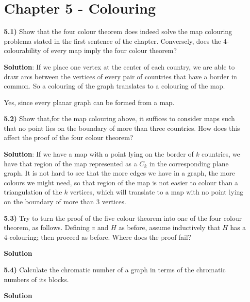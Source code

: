 \documentclass[11pt]{article}
\theoremstyle{plain}
\begin{document}
\section{Chapter 5 - Colouring}

\textbf{5.1)} Show that the four colour theorem does indeed solve the map colouring problema stated in the first sentence of the chapter. Conversely, does the 4-colourability of every map imply the four colour theorem?

\vspace{.4cm}
\noindent \textbf{Solution}: If we place one vertex at the center of each country, we are able to draw arcs between the vertices of every pair of countries that have a border in common. So a colouring of the graph translates to a colouring of the map.

Yes, since every planar graph can be formed from a map.

\vspace{.4cm}
\textbf{5.2)} Show that,for the map colouring above, it suffices to consider maps such that no point lies on the boundary of more than three countries. How does this affect the proof of the four colour theorem?

\vspace{.4cm}
\noindent \textbf{Solution}: If we have a map with a point lying on the border of $k$ countries, we have that region of the map represented as a $C_k$ in the corresponding plane graph. It is not hard to see that the more edges we have in a graph, the more colours we might need, so that region of the map is not easier to colour than a triangulation of the $k$ vertices, which will translate to a map with no point lying on the boundary of more than 3 vertices.

\vspace{.4cm}
\textbf{5.3)} Try to turn the proof of the five colour theorem into one of the four colour theorem, as follows. Defining $v$ and $H$ as before, assume inductively that $H$ has a 4-colouring; then proceed as before. Where does the proof fail?

\vspace{.4cm}
\noindent \textbf{Solution}

\vspace{.4cm}
\textbf{5.4)} Calculate the chromatic number of a graph in terms of the chromatic numbers of its blocks.

\vspace{.4cm}
\noindent \textbf{Solution}
\end{document}
